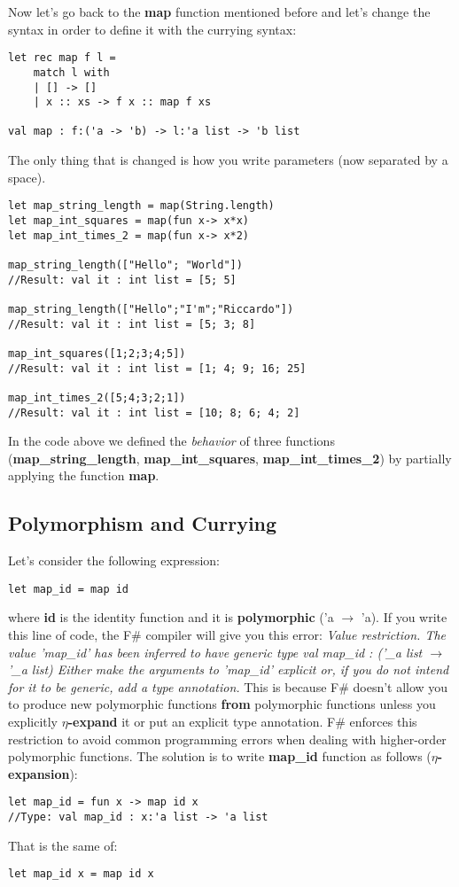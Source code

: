 Now let's go back to the \textbf{map} function mentioned before and let's change the syntax in order to define it with the currying syntax:
\begin{lstlisting}
let rec map f l = 
    match l with
    | [] -> []
    | x :: xs -> f x :: map f xs

val map : f:('a -> 'b) -> l:'a list -> 'b list
\end{lstlisting}
The only thing that is changed is how you write parameters (now separated by a space).
\begin{lstlisting}
let map_string_length = map(String.length)
let map_int_squares = map(fun x-> x*x)
let map_int_times_2 = map(fun x-> x*2)

map_string_length(["Hello"; "World"])
//Result: val it : int list = [5; 5]

map_string_length(["Hello";"I'm";"Riccardo"])
//Result: val it : int list = [5; 3; 8]

map_int_squares([1;2;3;4;5])
//Result: val it : int list = [1; 4; 9; 16; 25]

map_int_times_2([5;4;3;2;1])
//Result: val it : int list = [10; 8; 6; 4; 2]
\end{lstlisting}
In the code above we defined the \textit{behavior} of three functions (\textbf{map\_string\_length}, \textbf{map\_int\_squares}, \textbf{map\_int\_times\_2}) by partially applying the function \textbf{map}.
\subsection{Polymorphism and Currying}
Let's consider the following expression:
\begin{lstlisting}
let map_id = map id
\end{lstlisting}
where \textbf{id} is the identity function and it is \textbf{polymorphic} ('a $\rightarrow$ 'a). If you write this line of code, the F\# compiler will give you this error: \textit{Value restriction. The value 'map\_id' has been inferred to have generic type val map\_id : ('\_a list $\rightarrow$ '\_a list) Either make the arguments to 'map\_id' explicit or, if you do not intend for it to be generic, add a type annotation.} This is because F\# doesn't allow you to produce new polymorphic functions \textbf{from} polymorphic functions unless you explicitly \textbf{$\eta$-expand} it or put an explicit type annotation. F\# enforces this restriction to avoid common programming errors when dealing with higher-order polymorphic functions.\newline
The solution is to write \textbf{map\_id} function as follows (\textbf{$\eta$-expansion}):
\begin{lstlisting}
let map_id = fun x -> map id x
//Type: val map_id : x:'a list -> 'a list
\end{lstlisting}
That is the same of:
\begin{lstlisting}
let map_id x = map id x 
\end{lstlisting}
